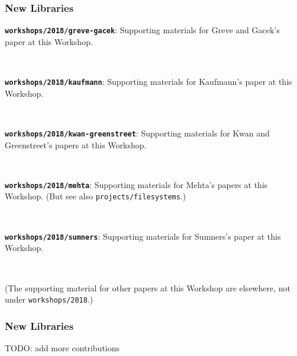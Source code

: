 \documentclass{beamer}
\newcommand{\code}[1]{\texttt{#1}}
\newcommand{\bookpath}[1]{\textbf{\code{#1}}}
\newcommand{\newlibtitle}{\frametitle{New Libraries}}
\begin{document}

\begin{frame}

\newlibtitle

\bookpath{workshops/2018/greve-gacek}:
Supporting materials for Greve and Gacek's paper at this Workshop.

\

\bookpath{workshops/2018/kaufmann}:
Supporting materials for Kaufmann's paper at this Workshop.

\

\bookpath{workshops/2018/kwan-greenstreet}:
Supporting materials for Kwan and Greenstreet's papers at this Workshop.

\

\bookpath{workshops/2018/mehta}:
Supporting materials for Mehta's papers at this Workshop.
(But see also \code{projects/filesystems}.)

\

\bookpath{workshops/2018/sumners}:
Supporting materials for Sumners's paper at this Workshop.

\

{\tiny
(The supporting material for other papers at this Workshop
are elsewhere, not under \code{workshops/2018}.)}

\end{frame}


\begin{frame}

\newlibtitle

TODO: add more contributions

\end{frame}

\end{document}

